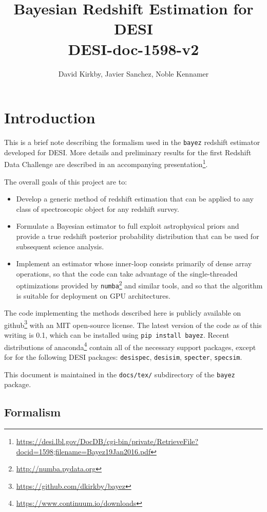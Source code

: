 \documentclass[11pt]{article}
\title{Bayesian Redshift Estimation for DESI\\
{\Large DESI-doc-1598-v2}}
\author{David Kirkby, Javier Sanchez, Noble Kennamer}
\begin{document}
\maketitle

\section{Introduction}

This is a brief note describing the formalism used in the {\tt bayez} redshift estimator developed for DESI.  More details and preliminary results for the first Redshift Data Challenge are described in an accompanying presentation\footnote{\url{
https://desi.lbl.gov/DocDB/cgi-bin/private/RetrieveFile?docid=1598;filename=Bayez19Jan2016.pdf}}.

The overall goals of this project are to:
\begin{itemize}
\item Develop a generic method of redshift estimation that can be applied to any class of spectroscopic object for any redshift survey.
\item Formulate a Bayesian estimator to full exploit astrophysical priors and provide a true redshift posterior probability distribution that can be used for subsequent science analysis.
\item Implement an estimator whose inner-loop consists primarily of dense array operations, so that the code can take advantage of the single-threaded optimizations provided by {\tt numba}\footnote{\url{http://numba.pydata.org}} and similar tools, and so that the algorithm is suitable for deployment on GPU architectures.
\end{itemize}

The code implementing the methods described here is publicly available on github\footnote{\url{https://github.com/dkirkby/bayez}} with an MIT open-source license. The latest version of the code as of this writing is 0.1, which can be installed using {\tt pip install bayez}.  Recent distributions of anaconda\footnote{\url{https://www.continuum.io/downloads}} contain all of the necessary support packages, except for for the following DESI packages: {\tt desispec}, {\tt desisim}, {\tt specter}, {\tt specsim}.

This document is maintained in the {\tt docs/tex/} subdirectory of the {\tt bayez} package.


\subsection{Formalism}
\end{document}
